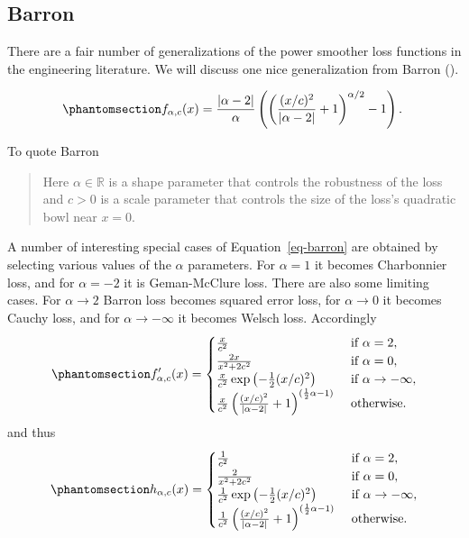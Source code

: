 \documentclass[
  12pt,
  letterpaper,
  DIV=11,
  numbers=noendperiod]{scrartcl}
\theoremstyle{plain}
\theoremstyle{plain}
\theoremstyle{plain}
\theoremstyle{definition}
\theoremstyle{definition}
\theoremstyle{remark}
\begin{document}
\subsection{Barron}\label{barron}

There are a fair number of generalizations of the power smoother loss
functions in the engineering literature. We will discuss one nice
generalization from Barron ().

\begin{equation}\phantomsection\label{eq-barron}{
f_{\alpha,c}(x)=\frac{|\alpha-2|}{\alpha}\left(\left(\frac{(x/c)^2}{|\alpha-2|}+1\right)^{\alpha/2}-1\right).\
}\end{equation}

To quote Barron

\begin{quote}
Here \(\alpha\in\mathbb{R}\) is a shape parameter that controls the
robustness of the loss and \(c>0\) is a scale parameter that controls
the size of the loss's quadratic bowl near \(x=0\).
\end{quote}

A number of interesting special cases of Equation~\ref{eq-barron} are
obtained by selecting various values of the \(\alpha\) parameters. For
\(\alpha=1\) it becomes Charbonnier loss, and for \(\alpha=-2\) it is
Geman-McClure loss. There are also some limiting cases. For
\(\alpha\rightarrow 2\) Barron loss becomes squared error loss, for
\(\alpha\rightarrow 0\) it becomes Cauchy loss, and for
\(\alpha\rightarrow-\infty\) it becomes Welsch loss. Accordingly
\begin{equation}\phantomsection\label{eq-barronf}{
f'_{\alpha,c}(x)=\begin{cases}
\frac{x}{c^2}&\text{ if }\alpha=2,\\
\frac{2x}{x^2+2c^2}&\text{ if }\alpha=0,\\
\frac{x}{c^2}\exp\left(-\frac12(x/c)^2\right)&\text{ if }\alpha\rightarrow-\infty,\\
\frac{x}{c^2}\left(\frac{(x/c)^2}{|\alpha-2|}+1\right)^{(\frac12\alpha-1)}&\text{ otherwise}.
\end{cases}
}\end{equation} and thus
\begin{equation}\phantomsection\label{eq-barronh}{
h_{\alpha,c}(x)=\begin{cases}
\frac{1}{c^2}&\text{ if }\alpha=2,\\
\frac{2}{x^2+2c^2}&\text{ if }\alpha=0,\\
\frac{1}{c^2}\exp\left(-\frac12(x/c)^2\right)&\text{ if }\alpha\rightarrow-\infty,\\
\frac{1}{c^2}\left(\frac{(x/c)^2}{|\alpha-2|}+1\right)^{(\frac12\alpha-1)}&\text{ otherwise}.
\end{cases}
}\end{equation}
\end{document}
